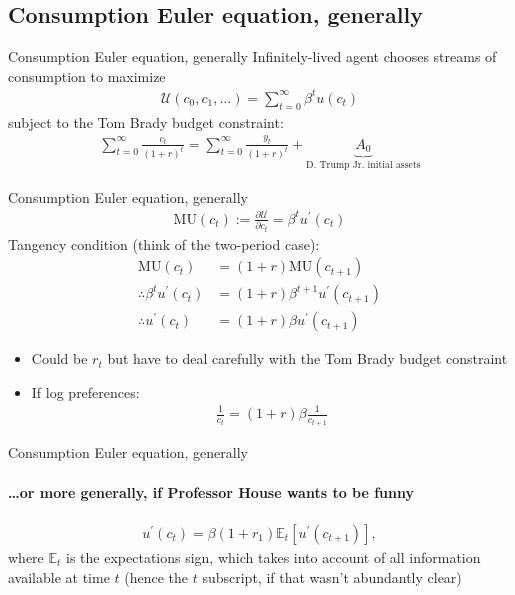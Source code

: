 \documentclass[presentation,dvipsnames]{beamer}
\begin{document}
\subsection{Consumption Euler equation, generally}
\begin{frame}[label=sec-2-2]{Consumption Euler equation, generally}
Infinitely-lived agent chooses streams of consumption to maximize
\begin{align*}
\mathcal{U}(c_{0},c_{1},\dots) = \sum\limits_{t=0}^{\infty} \beta^{t} u(c_{t})
\end{align*}
subject to the Tom Brady budget constraint:
\begin{align*}
\sum\limits_{t=0}^{\infty} \frac{c_{t}}{(1+r)^{t}} = \sum\limits_{t=0}^{\infty} \frac{y_{t}}{(1+r)^{t}} +
\underbrace{A_{0}}_{\text{D.~Trump Jr.~initial assets}}
\end{align*}
\end{frame}

\begin{frame}[label=sec-2-2]{Consumption Euler equation, generally}
\begin{align*}
\text{MU}(c_{t}) := \frac{\partial \mathcal{U}}{\partial c_{t}} = \beta^{t} u^{\prime}(c_{t})
\end{align*}
Tangency condition (think of the two-period case):
\begin{align*}
\text{MU}(c_{t}) &= (1+r) \text{MU}(c_{t+1}) \\
\therefore \beta^{t} u^{\prime}(c_{t}) &= (1+r) \beta^{t+1}u^{\prime}(c_{t+1}) \\
\therefore u^{\prime}(c_{t}) &= (1+r) \beta u^{\prime}(c_{t+1})
\end{align*}
\begin{itemize}[label={--}]
\item Could be $r_{t}$ but have to deal carefully with the Tom Brady budget constraint
\item If log preferences:
\begin{align*}
\frac{1}{c_{t}} = (1+r)\beta \frac{1}{c_{t+1}}
\end{align*}
\end{itemize}
\end{frame}

\begin{frame}[label=sec-2-2]{Consumption Euler equation, generally}
\framesubtitle{\dots or more generally, if Professor House wants to be funny}
\begin{align*}
u^{\prime}(c_{t}) = \beta (1+r_{1}) \mathbb{E}_{t} \left[ u^{\prime}(c_{t+1}) \right],
\end{align*}
where $\mathbb{E}_{t}$ is the expectations sign,
which takes into account of all information available at time $t$
(hence the $t$ subscript, if that wasn't abundantly clear)
\end{frame}
\end{document}

